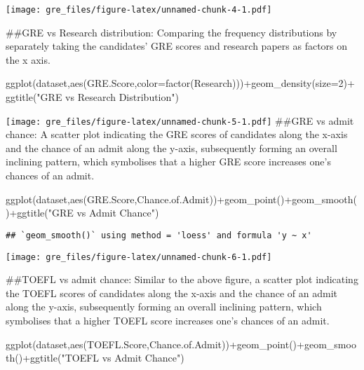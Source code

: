 \documentclass[
]{article}
\newenvironment{Shaded}{\begin{snugshade}}{\end{snugshade}}
\newcommand{\AttributeTok}[1]{\textcolor[rgb]{0.77,0.63,0.00}{#1}}
\newcommand{\DecValTok}[1]{\textcolor[rgb]{0.00,0.00,0.81}{#1}}
\newcommand{\FunctionTok}[1]{\textcolor[rgb]{0.00,0.00,0.00}{#1}}
\newcommand{\NormalTok}[1]{#1}
\newcommand{\SpecialCharTok}[1]{\textcolor[rgb]{0.00,0.00,0.00}{#1}}
\newcommand{\StringTok}[1]{\textcolor[rgb]{0.31,0.60,0.02}{#1}}
\begin{document}
\texttt{[image: gre\_files/figure-latex/unnamed-chunk-4-1.pdf]}

\#\#GRE vs Research distribution: Comparing the frequency distributions
by separately taking the candidates' GRE scores and research papers as
factors on the x axis.

\begin{Shaded}
\begin{Highlighting}[]
\FunctionTok{ggplot}\NormalTok{(dataset,}\FunctionTok{aes}\NormalTok{(GRE.Score,}\AttributeTok{color=}\FunctionTok{factor}\NormalTok{(Research)))}\SpecialCharTok{+}\FunctionTok{geom\_density}\NormalTok{(}\AttributeTok{size=}\DecValTok{2}\NormalTok{)}\SpecialCharTok{+}\FunctionTok{ggtitle}\NormalTok{(}\StringTok{"GRE vs Research Distribution"}\NormalTok{)}
\end{Highlighting}
\end{Shaded}

\texttt{[image: gre\_files/figure-latex/unnamed-chunk-5-1.pdf]} \#\#GRE
vs admit chance: A scatter plot indicating the GRE scores of candidates
along the x-axis and the chance of an admit along the y-axis,
subsequently forming an overall inclining pattern, which symbolises that
a higher GRE score increases one's chances of an admit.

\begin{Shaded}
\begin{Highlighting}[]
\FunctionTok{ggplot}\NormalTok{(dataset,}\FunctionTok{aes}\NormalTok{(GRE.Score,Chance.of.Admit))}\SpecialCharTok{+}\FunctionTok{geom\_point}\NormalTok{()}\SpecialCharTok{+}\FunctionTok{geom\_smooth}\NormalTok{()}\SpecialCharTok{+}\FunctionTok{ggtitle}\NormalTok{(}\StringTok{"GRE vs Admit Chance"}\NormalTok{)}
\end{Highlighting}
\end{Shaded}

\begin{verbatim}
## `geom_smooth()` using method = 'loess' and formula 'y ~ x'
\end{verbatim}

\texttt{[image: gre\_files/figure-latex/unnamed-chunk-6-1.pdf]}

\#\#TOEFL vs admit chance: Similar to the above figure, a scatter plot
indicating the TOEFL scores of candidates along the x-axis and the
chance of an admit along the y-axis, subsequently forming an overall
inclining pattern, which symbolises that a higher TOEFL score increases
one's chances of an admit.

\begin{Shaded}
\begin{Highlighting}[]
\FunctionTok{ggplot}\NormalTok{(dataset,}\FunctionTok{aes}\NormalTok{(TOEFL.Score,Chance.of.Admit))}\SpecialCharTok{+}\FunctionTok{geom\_point}\NormalTok{()}\SpecialCharTok{+}\FunctionTok{geom\_smooth}\NormalTok{()}\SpecialCharTok{+}\FunctionTok{ggtitle}\NormalTok{(}\StringTok{"TOEFL vs Admit Chance"}\NormalTok{)}
\end{Highlighting}
\end{Shaded}
\end{document}
